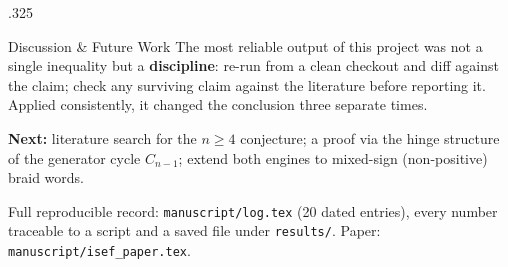 \documentclass[final]{beamer}
\begin{document}
\begin{frame}[t]
\begin{columns}[t, totalwidth=\textwidth]
\begin{column}{.325\linewidth}
\begin{block}{Discussion \& Future Work}
The most reliable output of this project was not a single inequality but
a \textbf{discipline}: re-run from a clean checkout and diff against the
claim; check any surviving claim against the literature before reporting
it. Applied consistently, it changed the conclusion three separate times.

\vspace{6pt}
\textbf{Next:} literature search for the $n\ge4$ conjecture; a proof via
the hinge structure of the generator cycle $C_{n-1}$; extend both engines
to mixed-sign (non-positive) braid words.

\vspace{10pt}
\small
Full reproducible record: \texttt{manuscript/log.tex} (20 dated entries),
every number traceable to a script and a saved file under
\texttt{results/}. Paper: \texttt{manuscript/isef\_paper.tex}.
\end{block}

\end{column}

\end{columns}
\end{frame}
\end{document}
